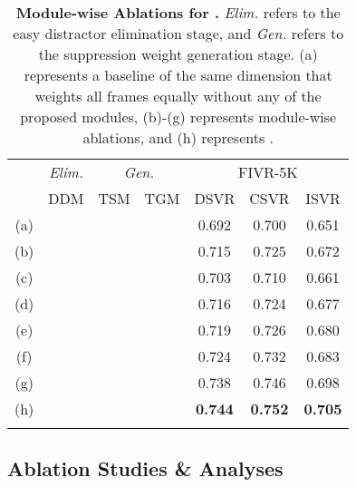 \documentclass[10pt,twocolumn,letterpaper]{article}
\newcommand{\cmark}{\ding{51}}
\begin{document}
     
        \begin{table}[!t]
            \footnotesize
            \centering
            \begin{tabular}{c|ccc|ccc}
                \cmidrule[\heavyrulewidth]{1-7}
                \morecmidrules
                \cmidrule[\heavyrulewidth]{1-7}
\multicolumn{1}{c}{\multirow{2}{*}[-.3em]{}}
                & \multicolumn{1}{|c|}{\textit{Elim.}}  & \multicolumn{2}{c|}{\textit{Gen.}} & \multicolumn{3}{c}{FIVR-5K} \\ \cmidrule(){2-7} 
               
                    &\multicolumn{1}{c|}{DDM} & TSM    & TGM    & DSVR  & CSVR  & ISVR  \\ \midrule 
                (a) &       &        &        & 0.692 & 0.700 & 0.651 \\ \midrule
                (b) &\cmark &        &        & 0.715 & 0.725 & 0.672 \\ \midrule
                (c) &       & \cmark &        & 0.703 & 0.710 & 0.661 \\
                (d) &       &        & \cmark & 0.716 & 0.724 & 0.677 \\
                (e) &       & \cmark & \cmark & 0.719 & 0.726 & 0.680 \\ \midrule 
                (f) &\cmark & \cmark &        & 0.724 & 0.732 & 0.683 \\ 
                (g) &\cmark &        & \cmark & 0.738 & 0.746 & 0.698 \\ \midrule
                (h) &\cmark & \cmark & \cmark & \textbf{0.744} & \textbf{0.752} & \textbf{0.705} \\
                \cmidrule[\heavyrulewidth]{1-7}
                \morecmidrules
                \cmidrule[\heavyrulewidth]{1-7}
            \end{tabular} \vspace{-4mm}
            \caption{\textbf{Module-wise Ablations for \textbf{.} }\textit{Elim.} refers to the easy distractor elimination stage, and \textit{Gen.} refers to the suppression weight generation stage. (a) represents a baseline of the same dimension that weights all frames equally without any of the proposed modules, (b)-(g) represents module-wise ablations, and (h) represents . \vspace{-4mm}}
            \label{tab:module_ablation}
        \end{table}
        
    \subsection{Ablation Studies \& Analyses}
\end{document}
